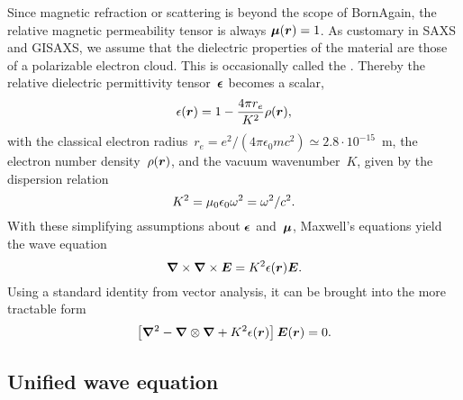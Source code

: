 Since magnetic refraction or scattering is beyond the scope of BornAgain,
the relative magnetic permeability tensor is always $\bm{\mu}(\bm{r})=1$.
%
%
As customary in SAXS and GISAXS,
%
%
we assume
that the dielectric properties of the material are those of a polarizable electron cloud.
This is occasionally called the 
%
\cite{Lau31}.
Thereby the relative dielectric permittivity tensor~$\bm{\epsilon}$
%
%
becomes a scalar,
\begin{equation}
  \epsilon(\bm{r})=1-\frac{4\pi r_e}{K^2}\rho(\bm{r}),
\end{equation}
%
%
with the classical electron radius~$r_e=e^2/(4\pi\epsilon_0 mc^2)\simeq2.8\cdot10^{-15}$~m,
%
%
%
the electron number density~$\rho(\bm{r})$,
%
%
%
and the vacuum wavenumber~$K$,
given by the dispersion relation
\begin{equation}
  K^2 = \mu_0\epsilon_0\omega^2 = \omega^2/c^2.
\end{equation}
%
With these simplifying assumptions about $\bm{\epsilon}$ and~$\bm{\mu}$,
Maxwell's equations yield the wave equation
\begin{equation}\label{ENabCrossNabE}
  \Nabla\times\Nabla\times\v{E} = K^2\eps(\r)\v{E}.
\end{equation}
%
%
Using a standard identity from vector analysis, it can be brought into the more tractable form
\begin{equation}\label{ENabNabE}
  \left[\Nabla^2-\Nabla\otimes\Nabla+ K^2\eps(\r)\right]\v{E}(\r)=0.
\end{equation}

%
%

\subsection{Unified wave equation}\label{SuniWave}


